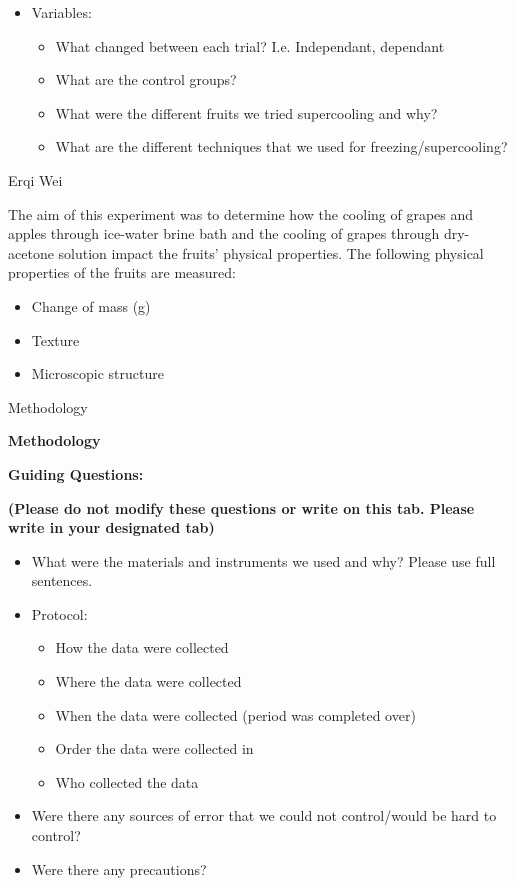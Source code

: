 \begin{itemize}
\item
  Variables:

  \begin{itemize}
  \item
    What changed between each trial? I.e. Independant, dependant
  \item
    What are the control groups?
  \item
    What were the different fruits we tried supercooling and why?
  \item
    What are the different techniques that we used for
    freezing/supercooling?
  \end{itemize}
\end{itemize}

Erqi Wei

The aim of this experiment was to determine how the cooling of grapes
and apples through ice-water brine bath and the cooling of grapes
through dry-acetone solution impact the fruits' physical properties. The
following physical properties of the fruits are measured:

\begin{itemize}
\item
  Change of mass (g)
\item
  Texture
\item
  Microscopic structure
\end{itemize}

Methodology

\textbf{Methodology}

\textbf{Guiding Questions:}

\textbf{(Please do not modify these questions or write on this tab.
Please write in your designated tab)}

\begin{itemize}
\item
  What were the materials and instruments we used and why? Please use
  full sentences.
\item
  Protocol:

  \begin{itemize}
  \item
    How the data were collected
  \item
    Where the data were collected
  \item
    When the data were collected (period was completed over)
  \item
    Order the data were collected in
  \item
    Who collected the data
  \end{itemize}
\item
  Were there any sources of error that we could not control/would be
  hard to control?
\item
  Were there any precautions?
\end{itemize}

